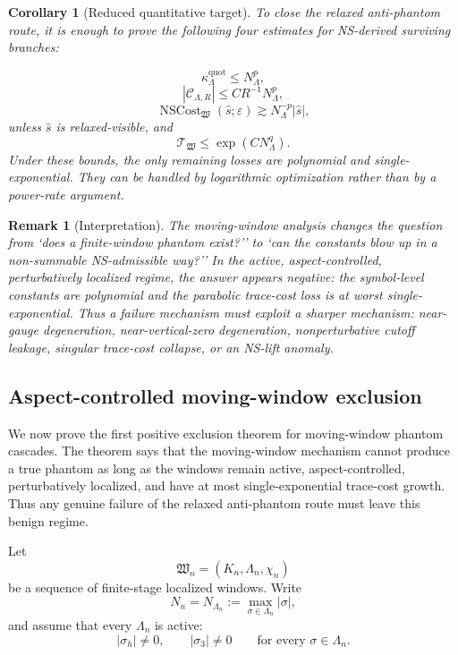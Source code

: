 \documentclass[11pt]{article}
\numberwithin{equation}{section}
\newtheorem{corollary}[theorem]{Corollary}
\newtheorem{remark}[theorem]{Remark}
\begin{document}
\begin{corollary}[Reduced quantitative target]
To close the relaxed anti-phantom route, it is enough to prove the following four estimates for NS-derived surviving branches:

\[
\kappa_\Lambda^{\mathrm{quot}}
\le
N_\Lambda^p,
\]
\[
|\mathcal C_{\Lambda,R}|
\le
C R^{-1}N_\Lambda^p,
\]
\[
\operatorname{NSCost}_{\mathfrak W}(\widehat s;\varepsilon)
\gtrsim
N_\Lambda^{-p}|\widehat s|,
\]
unless \(\widehat s\) is relaxed-visible, and
\[
\mathcal T_{\mathfrak W}
\le
\exp(CN_\Lambda^q).
\]
Under these bounds, the only remaining losses are polynomial and single-exponential. They can be handled by logarithmic optimization rather than by a power-rate argument.
\end{corollary}

\begin{remark}[Interpretation]
The moving-window analysis changes the question from `does a finite-window phantom exist?'' to `can the constants blow up in a non-summable NS-admissible way?'' In the active, aspect-controlled, perturbatively localized regime, the answer appears negative: the symbol-level constants are polynomial and the parabolic trace-cost loss is at worst single-exponential. Thus a failure mechanism must exploit a sharper mechanism: near-gauge degeneration, near-vertical-zero degeneration, nonperturbative cutoff leakage, singular trace-cost collapse, or an NS-lift anomaly.
\end{remark}

\subsection{Aspect-controlled moving-window exclusion}\label{subsec:aspect-controlled-moving-window-exclusion}

We now prove the first positive exclusion theorem for moving-window phantom cascades.  The theorem says that the moving-window mechanism cannot produce a true phantom as long as the windows remain active, aspect-controlled, perturbatively localized, and have at most single-exponential trace-cost growth.  Thus any genuine failure of the relaxed anti-phantom route must leave this benign regime.

Let
\[
        \mathfrak W_n=(K_n,\Lambda_n,\chi_n)
\]
be a sequence of finite-stage localized windows.  Write
\[
        N_n=N_{\Lambda_n}:=\max_{\sigma\in\Lambda_n}|\sigma|,
\]
and assume that every \(\Lambda_n\) is active:
\[
        |\sigma_h|\neq0,
        \qquad
        |\sigma_3|\neq0
        \qquad
        \text{for every }\sigma\in\Lambda_n.
\]
\end{document}
